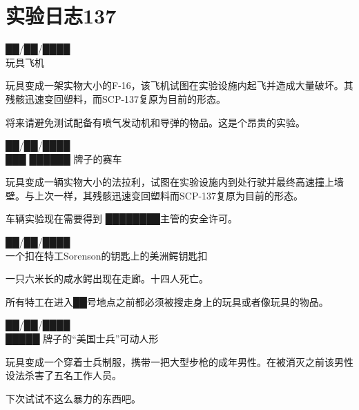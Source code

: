 \section{实验日志137}

\label{sec:DOC-experiment-log-137}

\begin{scpbox}

██\slash ██\slash ████\\
玩具飞机

玩具变成一架实物大小的F-16，该飞机试图在实验设施内起飞并造成大量破坏。其残骸迅速变回塑料，而SCP-137复原为目前的形态。

将来请避免测试配备有喷气发动机和导弹的物品。这是个昂贵的实验。

\end{scpbox}

\begin{scpbox}

██\slash ██\slash ████\\
███ ██████ 牌子的赛车

玩具变成一辆实物大小的法拉利，试图在实验设施内到处行驶并最终高速撞上墙壁。与上次一样，其残骸迅速变回塑料而SCP-137复原为目前的形态。

车辆实验现在需要得到 ████████主管的安全许可。

\end{scpbox}

\begin{scpbox}

██\slash ██\slash ████\\
一个扣在特工Sorenson的钥匙上的美洲鳄钥匙扣

一只六米长的咸水鳄出现在走廊。十四人死亡。

所有特工在进入██号地点之前都必须被搜走身上的玩具或者像玩具的物品。

\end{scpbox}

\begin{scpbox}

██\slash ██\slash ████\\
█████ 牌子的“美国士兵”可动人形

玩具变成一个穿着士兵制服，携带一把大型步枪的成年男性。在被消灭之前该男性设法杀害了五名工作人员。

下次试试不这么暴力的东西吧。

\end{scpbox}

